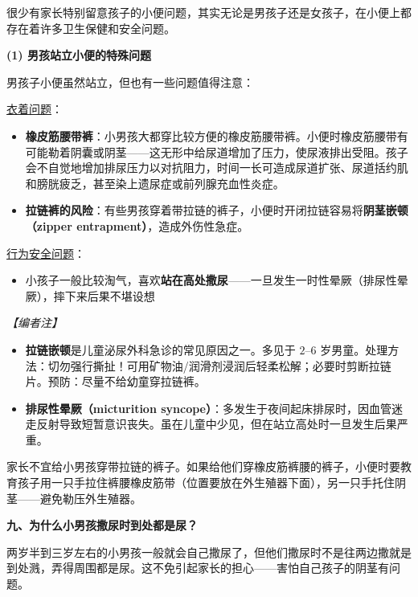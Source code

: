 很少有家长特别留意孩子的小便问题，其实无论是男孩子还是女孩子，在小便上都存在着许多卫生保健和安全问题。

\vspace{0.5em}
\noindent\textbf{(1) 男孩站立小便的特殊问题}

男孩子小便虽然站立，但也有一些问题值得注意：

\underline{衣着问题}：
\begin{itemize}
	\item \textbf{橡皮筋腰带裤}：小男孩大都穿比较方便的橡皮筋腰带裤。小便时橡皮筋腰带有可能勒着阴囊或阴茎——这无形中给尿道增加了压力，使尿液排出受阻。孩子会不自觉地增加排尿压力以对抗阻力，时间一长可造成尿道扩张、尿道括约肌和膀胱疲乏，甚至染上遗尿症或前列腺充血性炎症。
	\item \textbf{拉链裤的风险}：有些男孩穿着带拉链的裤子，小便时开闭拉链容易将\textbf{阴茎嵌顿（zipper entrapment）}，造成外伤性急症。
\end{itemize}

\underline{行为安全问题}：
\begin{itemize}
	\item 小孩子一般比较淘气，喜欢\textbf{站在高处撒尿}——一旦发生一时性晕厥（排尿性晕厥），摔下来后果不堪设想
\end{itemize}

\vspace{0.3em}
\noindent\textit{【编者注】}
\begin{itemize}
	\item \textbf{拉链嵌顿}是儿童泌尿外科急诊的常见原因之一。多见于 $2$--$6$ 岁男童。处理方法：切勿强行撕扯！可用矿物油/润滑剂浸润后轻柔松解；必要时剪断拉链片。预防：尽量不给幼童穿拉链裤。
	\item \textbf{排尿性晕厥（micturition syncope）}：多发生于夜间起床排尿时，因血管迷走反射导致短暂意识丧失。虽在儿童中少见，但在站立高处时一旦发生后果严重。
\end{itemize}

\begin{tcolorbox}[colback=pink!5!white,colframe=red!50!black,title=贴心小叮咛]
家长不宜给小男孩穿带拉链的裤子。如果给他们穿橡皮筋裤腰的裤子，小便时要教育孩子用一只手拉住裤腰橡皮筋带（位置要放在外生殖器下面），另一只手托住阴茎——避免勒压外生殖器。
\end{tcolorbox}

\vspace{0.8em}
\noindent\textbf{九、为什么小男孩撒尿时到处都是尿？}

两岁半到三岁左右的小男孩一般就会自己撒尿了，但他们撒尿时不是往两边撒就是到处溅，弄得周围都是尿。这不免引起家长的担心——害怕自己孩子的阴茎有问题。

